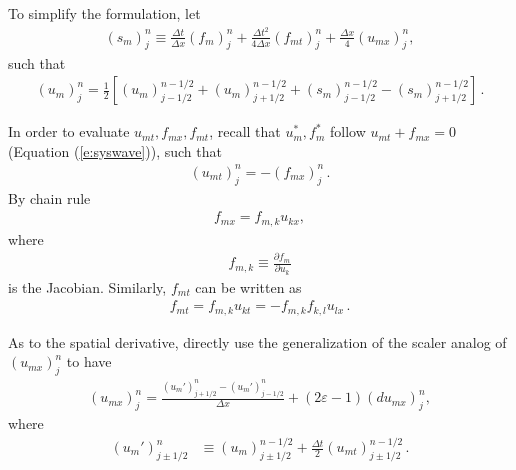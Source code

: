 \documentclass[letterpaper,12pt,dvips]{article}
\numberwithin{equation}{section}
\begin{document}
To simplify the formulation, let
\begin{align}
  (s_m)_j^n \equiv \frac{\Delta t}{\Delta x}(f_m)_j^n 
    + \frac{\Delta t^2}{4\Delta x}(f_{mt})_j^n
    + \frac{\Delta x}{4}(u_{mx})_j^n, \label{e:sm}
\end{align}
such that
\begin{align*}
  (u_m)_j^n = \frac{1}{2}\left[
      (u_m)_{j-1/2}^{n-1/2} + (u_m)_{j+1/2}^{n-1/2}
    + (s_m)_{j-1/2}^{n-1/2} - (s_m)_{j+1/2}^{n-1/2} 
    \right]\,.
\end{align*}

In order to evaluate $u_{mt}, f_{mx}, f_{mt}$, recall that 
$u_m^*, f_m^*$ follow $u_{mt}+f_{mx}=0$ (Equation (\ref{e:syswave})), such 
that
\begin{align}
  (u_{mt})_j^n = -(f_{mx})_j^n\,. \label{e:sysumt}
\end{align}
By chain rule
\begin{align}
  f_{mx} = f_{m,k}u_{kx}, \label{e:sysfmk}
\end{align}
where 
\begin{align}
  f_{m,k} \equiv \frac{\partial f_m}{\partial u_k} \label{e:sysjacobian}
\end{align}
is the Jacobian.
Similarly, $f_{mt}$ can be written as
\begin{align}
  f_{mt} = f_{m,k}u_{kt} = -f_{m,k}f_{k,l}u_{lx}\,. \label{e:sysfmt}
\end{align}

As to the spatial derivative, directly use the generalization of the 
scaler analog of $(u_{mx})_j^n$ to have
\begin{align*}
  (u_{mx})_j^n = \frac{(u_m')_{j+1/2}^n-(u_m')_{j-1/2}^n}{\Delta x}
    + (2\varepsilon-1)(du_{mx})_j^n, 
\end{align*}
where
\begin{align}
  (u_m')_{j\pm1/2}^n &\equiv 
      (u_m)_{j\pm1/2}^{n-1/2} 
    + \frac{\Delta t}{2}(u_{mt})_{j\pm1/2}^{n-1/2}\,. \label{e:ump}
\end{align}
\end{document}
